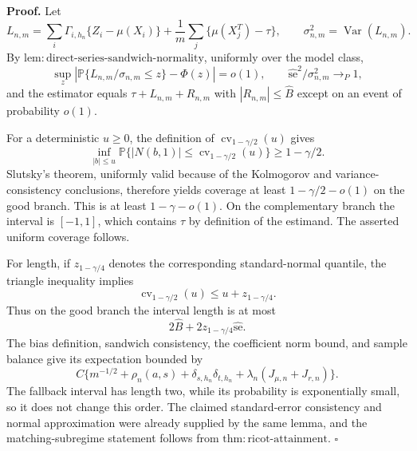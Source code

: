 \textbf{Proof.}
Let
\[
L_{n,m}=\sum_i\Gamma_{i,h_n}\{Z_i-\mu(X_i)\}
+\frac1m\sum_j\{\mu(X_j^T)-\tau\},
\qquad
\sigma_{n,m}^2=\operatorname{Var}(L_{n,m}).
\]
By \(\mathrm{lem:direct\text{-}series\text{-}sandwich\text{-}normality}\), uniformly over the model class,
\[
\sup_z\left|\mathbb P\{L_{n,m}/\sigma_{n,m}\le z\}-\Phi(z)\right|=o(1),
\qquad
\widehat{\mathrm{se}}^2/\sigma_{n,m}^2\to_P1,
\]
and the estimator equals \(\tau+L_{n,m}+R_{n,m}\) with \(|R_{n,m}|\le\widehat B\) except on an event of probability \(o(1)\).

For a deterministic \(u\ge0\), the definition of \(\operatorname{cv}_{1-\gamma/2}(u)\) gives
\[
\inf_{|b|\le u}\mathbb P\{|N(b,1)|\le\operatorname{cv}_{1-\gamma/2}(u)\}\ge1-\gamma/2.
\]
Slutsky's theorem, uniformly valid because of the Kolmogorov and variance-consistency conclusions, therefore yields coverage at least \(1-\gamma/2-o(1)\) on the good branch.  This is at least \(1-\gamma-o(1)\).  On the complementary branch the interval is \([-1,1]\), which contains \(\tau\) by definition of the estimand.  The asserted uniform coverage follows.

For length, if \(z_{1-\gamma/4}\) denotes the corresponding standard-normal quantile, the triangle inequality implies
\[
\operatorname{cv}_{1-\gamma/2}(u)\le u+z_{1-\gamma/4}.
\]
Thus on the good branch the interval length is at most
\[
2\widehat B+2z_{1-\gamma/4}\widehat{\mathrm{se}}.
\]
The bias definition, sandwich consistency, the coefficient norm bound, and sample balance give its expectation bounded by
\[
C\{m^{-1/2}+\rho_n(a,s)+\delta_{s,h_n}\delta_{t,h_n}
+\lambda_n(J_{\mu,n}+J_{r,n})\}.
\]
The fallback interval has length two, while its probability is exponentially small, so it does not change this order.  The claimed standard-error consistency and normal approximation were already supplied by the same lemma, and the matching-subregime statement follows from \(\mathrm{thm:ricot\text{-}attainment}\). \(\square\)